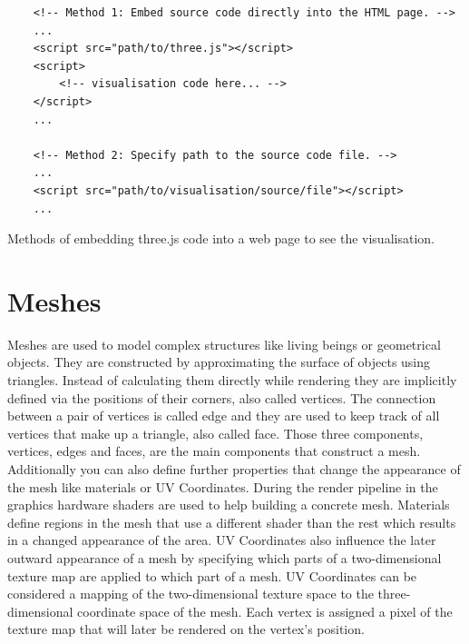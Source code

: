 \begin{listing}[H]
	\begin{verbatim}
	<!-- Method 1: Embed source code directly into the HTML page. -->
	...
	<script src="path/to/three.js"></script>
	<script>
		<!-- visualisation code here... -->
	</script>
	...
	
	<!-- Method 2: Specify path to the source code file. -->
	...
	<script src="path/to/visualisation/source/file"></script>
	...
	\end{verbatim}
	\caption{Methods of embedding three.js code into a web page to see the visualisation.}
	\label{sec:visualconcepts:three:threeembedding}
\end{listing}

\section{Meshes}
\label{sec:visualconcepts:meshes}

Meshes are used to model complex structures like living beings or geometrical objects. They are constructed by approximating the surface of objects using triangles. Instead of calculating them directly while rendering they are implicitly defined via the positions of their corners, also called vertices. The connection between a pair of vertices is called edge and they are used to keep track of all vertices that make up a triangle, also called face. Those three components, vertices, edges and faces, are the main components that construct a mesh. Additionally you can also define further properties that change the appearance of the mesh like materials or UV Coordinates. During the render pipeline in the graphics hardware shaders are used to help building a concrete mesh. Materials define regions in the mesh that use a different shader than the rest which results in a changed appearance of the area. UV Coordinates also influence the later outward appearance of a mesh by specifying which parts of a two-dimensional texture map are applied to which part of a mesh. UV Coordinates can be considered a mapping of the two-dimensional texture space to the three-dimensional coordinate space of the mesh. Each vertex is assigned a pixel of the texture map that will later be rendered on the vertex's position.

